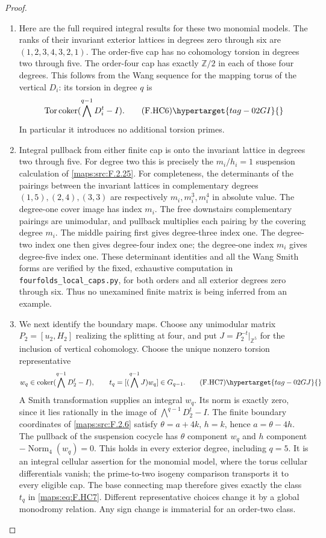 \begin{proof}
\begin{enumerate}[label={$\langle1\rangle$\arabic*.}]
\item Here are the full required integral results for these
two monomial models.
The ranks of their invariant exterior lattices in
degrees zero through six are
$(1,2,3,4,3,2,1)$.
The order-five cap has no cohomology torsion in degrees
two through five.
The order-four cap has exactly $\mathbb Z/2$ in each
of those four degrees.
This follows from the Wang sequence for the mapping
torus of the vertical $D_i$:
its torsion in degree $q$ is
\[
 \operatorname{Tor}\operatorname{coker}
       (\bigwedge^{q-1}D_i^t-I).
 \tag{F.HC6}\hypertarget{tag-02GI}{}\label{maps:eq:F.HC6}
\]
In particular it introduces no additional torsion primes.

\item Integral pullback from either finite cap is onto the
invariant lattice in degrees two through five.
For degree two this is precisely the $m_i/h_i=1$
suspension calculation of \ref{maps:src:F.2.25}.
For completeness, the determinants of the pairings between
the invariant lattices in complementary degrees
$(1,5),(2,4),(3,3)$ are respectively
$m_i,m_i^3,m_i^4$ in absolute value.
The degree-one cover image has index $m_i$.
The free downstairs complementary pairings are unimodular,
and pullback multiplies each pairing by the covering
degree $m_i$.
The middle pairing first gives degree-three index one.
The degree-two index one then gives degree-four index one;
the degree-one index $m_i$ gives degree-five index one.
These determinant identities and all the Wang Smith
forms are verified by the fixed, exhaustive computation
in \texttt{fourfolds\_local\_caps.py}, for both orders and
all exterior degrees zero through six.
Thus no unexamined finite matrix is being inferred from
an example.

\item We next identify the boundary maps.
Choose any unimodular matrix $P_2=[u_2,H_2]$ realizing
the splitting at four, and put
$J=P_2^{-t}|_{\mathbb Z^5}$ for the inclusion of vertical
cohomology.
Choose the unique nonzero torsion representative
\[
 w_q\in\operatorname{coker}
            (\bigwedge^{q-1}D_2^t-I),\qquad
 t_q=[(\bigwedge^{q-1}J)w_q]\in G_{q-1}.
 \tag{F.HC7}\hypertarget{tag-02GJ}{}\label{maps:eq:F.HC7}
\]
A Smith transformation supplies an integral $w_q$.
Its norm is exactly zero, since it lies rationally in
the image of $\bigwedge^{q-1}D_2^t-I$.
The finite boundary coordinates of \ref{maps:src:F.2.6} satisfy
$\theta=a+4k$, $h=k$, hence $a=\theta-4h$.
The pullback of the suspension cocycle has $\theta$
component $w_q$ and $h$ component
$-\operatorname{Norm}_4(w_q)=0$.
This holds in every exterior degree, including $q=5$.
It is an integral cellular assertion for the monomial
model, where the torus cellular differentials vanish;
the prime-to-two isogeny comparison transports it to
every eligible cap.
The base connecting map therefore gives exactly the
class $t_q$ in \eqref{maps:eq:F.HC7}.
Different representative choices change it by a global
monodromy relation.  Any sign change is immaterial for
an order-two class.


\end{enumerate}
\end{proof}
